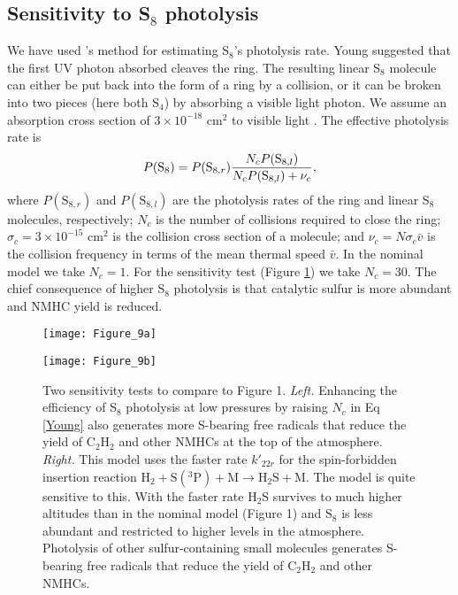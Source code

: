 \documentclass[preprint]{aastex6}
\newcounter{reaction}
\begin{document}
\subsection{Sensitivity to S$_8$ photolysis}

We have used \citet{Young1983}'s method for estimating S$_8$'s photolysis rate.
Young suggested that the first UV photon absorbed cleaves the ring.
The resulting linear S$_8$ molecule can either be put back into the form of a ring by a collision,
or it can be broken into two pieces (here both S$_4$) by absorbing a visible light photon.
We assume an absorption cross section of $3\times 10^{-18}$ cm$^2$ to visible light \citep[$\lambda < 850$ nm,][]{Meyer1976}.
 The effective photolysis rate is 
\begin{equation}
\label{Young}
 P(\mathrm{S}_{8}) = P(\mathrm{S}_{8,r}) {N_c P(\mathrm{S}_{8,l})\over N_c P(\mathrm{S}_{8,l}) + \nu_{c} },
\end{equation} 
 where $P(\mathrm{S}_{8,r})$ and $P(\mathrm{S}_{8,l})$ 
 are the photolysis rates of the ring and linear S$_8$ molecules, respectively;
 $N_{c}$ is the number of collisions required to close the ring;
$\sigma_{c}=3\times 10^{-15}$ cm$^2$ is the collision cross section of a molecule;
and $\nu_{c} = N\sigma_{c}{\bar v}$ is the collision frequency in terms of the mean thermal speed ${\bar v}$. 
In the nominal model we take $N_{c}=1$.  For the sensitivity test (Figure \ref{sensitivity}) we take $N_c=30$.
The chief consequence of higher S$_8$ photolysis is that catalytic sulfur is more abundant
 and NMHC yield is reduced. 

\begin{figure}[!htb]
 \centering
  \begin{minipage}[c]{0.49\textwidth}
   \centering
 \texttt{[image: Figure\_9a]} 
 \end{minipage}
\begin{minipage}[c]{0.49\textwidth}
   \centering
  \texttt{[image: Figure\_9b]} 
 \end{minipage}
  \caption{\small Two sensitivity tests to compare to Figure 1.
   {\it Left.} Enhancing the efficiency of S$_8$ photolysis at low pressures by raising $N_c$ in Eq \ref{Young}
   also generates more S-bearing free radicals that reduce the yield of C$_2$H$_2$ and other NMHCs at the top of the atmosphere.
   {\it Right.} This model uses the faster rate $k'_{22r}$ for the spin-forbidden insertion reaction
   $\mathrm{H}_2 + \mathrm{S}(^3\mathrm{P}) + \mathrm{M} \rightarrow \mathrm{H}_2\mathrm{S} + \mathrm{M} $. 
   The model is quite sensitive to this.
   With the faster rate H$_2$S survives to much higher altitudes than in the nominal model (Figure 1) and
   S$_8$ is less abundant and restricted to higher levels in the atmosphere.  Photolysis of
   other sulfur-containing small molecules generates S-bearing free radicals that reduce the yield of C$_2$H$_2$ and other NMHCs. 
  }
\label{sensitivity}
\end{figure}
\end{document}
